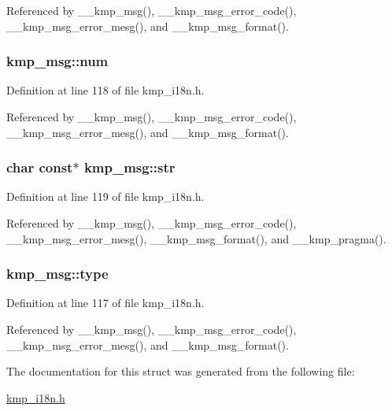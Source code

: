Referenced by \-\_\-\-\_\-kmp\-\_\-msg(), \-\_\-\-\_\-kmp\-\_\-msg\-\_\-error\-\_\-code(), \-\_\-\-\_\-kmp\-\_\-msg\-\_\-error\-\_\-mesg(), and \-\_\-\-\_\-kmp\-\_\-msg\-\_\-format().

\hypertarget{structkmp__msg_a21b5d71a9147f3809b40c24485a80b3d}{
\subsubsection[{num}]{ kmp\-\_\-msg\-::num}}\label{structkmp__msg_a21b5d71a9147f3809b40c24485a80b3d}


Definition at line 118 of file kmp\-\_\-i18n.\-h.



Referenced by \-\_\-\-\_\-kmp\-\_\-msg(), \-\_\-\-\_\-kmp\-\_\-msg\-\_\-error\-\_\-code(), \-\_\-\-\_\-kmp\-\_\-msg\-\_\-error\-\_\-mesg(), and \-\_\-\-\_\-kmp\-\_\-msg\-\_\-format().

\hypertarget{structkmp__msg_a11afed2746b1029dcb932a89c56feb78}{
\subsubsection[{str}]{\setlength{\rightskip}{0pt plus 5cm}char const$\ast$ kmp\-\_\-msg\-::str}}\label{structkmp__msg_a11afed2746b1029dcb932a89c56feb78}


Definition at line 119 of file kmp\-\_\-i18n.\-h.



Referenced by \-\_\-\-\_\-kmp\-\_\-msg(), \-\_\-\-\_\-kmp\-\_\-msg\-\_\-error\-\_\-code(), \-\_\-\-\_\-kmp\-\_\-msg\-\_\-error\-\_\-mesg(), \-\_\-\-\_\-kmp\-\_\-msg\-\_\-format(), and \-\_\-\-\_\-kmp\-\_\-pragma().

\hypertarget{structkmp__msg_a6059b90ca79c673b7b3a33bf4c4d8642}{
\subsubsection[{type}]{ kmp\-\_\-msg\-::type}}\label{structkmp__msg_a6059b90ca79c673b7b3a33bf4c4d8642}


Definition at line 117 of file kmp\-\_\-i18n.\-h.



Referenced by \-\_\-\-\_\-kmp\-\_\-msg(), \-\_\-\-\_\-kmp\-\_\-msg\-\_\-error\-\_\-code(), \-\_\-\-\_\-kmp\-\_\-msg\-\_\-error\-\_\-mesg(), and \-\_\-\-\_\-kmp\-\_\-msg\-\_\-format().



The documentation for this struct was generated from the following file\-:\begin{DoxyCompactItemize}
\item 
\hyperlink{kmp__i18n_8h}{kmp\-\_\-i18n.\-h}\end{DoxyCompactItemize}
